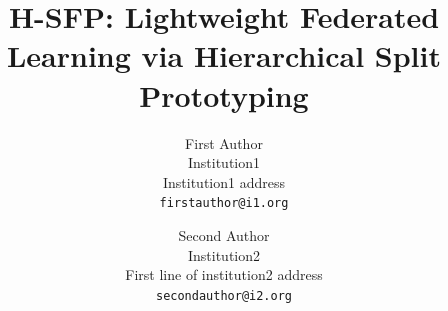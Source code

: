 \documentclass[10pt,twocolumn,letterpaper]{article}
\title{H-SFP: Lightweight Federated Learning via Hierarchical Split Prototyping}
\author{First Author\\
Institution1\\
Institution1 address\\
{\tt\small firstauthor@i1.org}
\and
Second Author\\
Institution2\\
First line of institution2 address\\
{\tt\small secondauthor@i2.org}
}
\begin{document}
\maketitle
    




% 


{
    \small
    
    
}

% 
\end{document}
